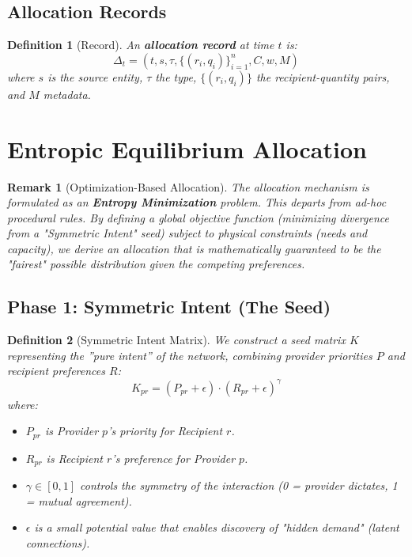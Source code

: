 \documentclass[11pt]{article}
\newtheorem{definition}{Definition}
\newtheorem{remark}{Remark}
\begin{document}
\subsection{Allocation Records}

\begin{definition}[Record]
An \textbf{allocation record} at time $t$ is:
\[
\Delta_t = (t, s, \tau, \{(r_i, q_i)\}_{i=1}^n, C, w, M)
\]
where $s$ is the source entity, $\tau$ the type, $\{(r_i, q_i)\}$ the recipient-quantity pairs, and $M$ metadata.
\end{definition}

\section{Entropic Equilibrium Allocation}

\begin{remark}[Optimization-Based Allocation]
The allocation mechanism is formulated as an \textbf{Entropy Minimization} problem. This departs from ad-hoc procedural rules. By defining a global objective function (minimizing divergence from a "Symmetric Intent" seed) subject to physical constraints (needs and capacity), we derive an allocation that is mathematically guaranteed to be the "fairest" possible distribution given the competing preferences.
\end{remark}

\subsection{Phase 1: Symmetric Intent (The Seed)}

\begin{definition}[Symmetric Intent Matrix]
We construct a seed matrix $K$ representing the ''pure intent'' of the network, combining provider priorities $P$ and recipient preferences $R$:
\[
K_{pr} = (P_{pr} + \epsilon) \cdot (R_{pr} + \epsilon)^\gamma
\]
where:
\begin{itemize}
    \item $P_{pr}$ is Provider $p$'s priority for Recipient $r$.
    \item $R_{pr}$ is Recipient $r$'s preference for Provider $p$.
    \item $\gamma \in [0,1]$ controls the symmetry of the interaction (0 = provider dictates, 1 = mutual agreement).
    \item $\epsilon$ is a small potential value that enables discovery of "hidden demand" (latent connections).
\end{itemize}
\end{definition}
\end{document}
